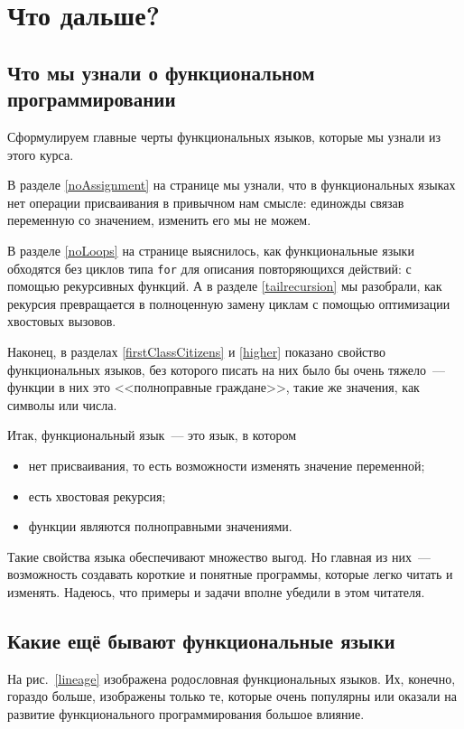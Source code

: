 \documentclass[
  paper=a4,
  fontsize=14pt,
  openany,
  appendixprefix=true
]{scrbook}
\begin{document}
\chapter{Что дальше?}

\section{Что мы узнали о функциональном программировании}
\label{definition}

Сформулируем главные черты функциональных языков, которые мы узнали из этого курса.

В разделе \ref{noAssignment} на странице \pageref{noAssignment} мы узнали, что в функциональных языках нет операции присваивания в привычном нам смысле: единожды связав переменную со значением, изменить его мы не можем.

В разделе \ref{noLoops} на странице \pageref{noLoops} выяснилось, как функциональные языки обходятся без циклов типа \lstinline{for} для описания повторяющихся действий: с помощью рекурсивных функций. А в разделе \ref{tailrecursion} мы разобрали, как рекурсия превращается в полноценную замену циклам с помощью оптимизации хвостовых вызовов.

Наконец, в разделах \ref{firstClassCitizens} и \ref{higher} показано свойство функциональных языков, без которого писать на них было бы очень тяжело~--- функции в них это <<полноправные граждане>>, такие же значения, как символы или числа.

Итак, функциональный язык~--- это язык, в котором
\begin{itemize}
\item нет присваивания, то есть возможности изменять значение переменной;
\item есть хвостовая рекурсия;
\item функции являются полноправными значениями.
\end{itemize}

Такие свойства языка обеспечивают множество выгод. Но главная из них~--- возможность создавать короткие и понятные программы, которые легко читать и изменять. Надеюсь, что примеры и задачи вполне убедили в этом читателя.

\section{Какие ещё бывают функциональные языки}

На рис.~\ref{lineage} изображена родословная функциональных языков. Их, конечно, гораздо больше, изображены только те, которые очень популярны или оказали на развитие функционального программирования большое влияние.
\end{document}
